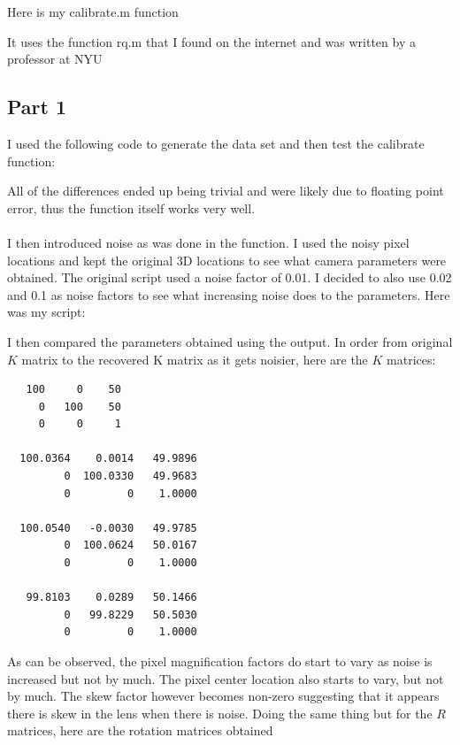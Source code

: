 \documentclass[11pt,psfig]{article}
\begin{document}
Here is my calibrate.m function

It uses the function rq.m that I found on the internet and was written by a professor at NYU


\subsection{Part 1}

I used the following code to generate the data set and then test the calibrate function:

All of the differences ended up being trivial and were likely due to floating point error, thus the function itself works very well. \\
\\
I then introduced noise as was done in the function. I used the noisy pixel locations and kept the original 3D locations to see what camera parameters were obtained. The original script used a noise factor of 0.01. I decided to also use 0.02 and 0.1 as noise factors to see what increasing noise does to the parameters. Here was my script:


I then compared the parameters obtained using the output. In order from original $K$ matrix to the recovered K matrix as it gets noisier, here are the $K$ matrices:
\begin{verbatim}
   100     0    50
     0   100    50
     0     0     1

  100.0364    0.0014   49.9896
         0  100.0330   49.9683
         0         0    1.0000

  100.0540   -0.0030   49.9785
         0  100.0624   50.0167
         0         0    1.0000

   99.8103    0.0289   50.1466
         0   99.8229   50.5030
         0         0    1.0000
\end{verbatim}

As can be observed, the pixel magnification factors do start to vary as noise is increased but not by much. The pixel center location also starts to vary, but not by much. The skew factor however becomes non-zero suggesting that it appears there is skew in the lens when there is noise. 
\newpage
Doing the same thing but for the $R$ matrices, here are the rotation matrices obtained
\end{document}
